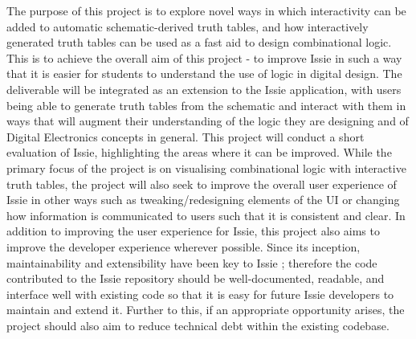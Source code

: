 The purpose of this project is to explore novel ways in which interactivity can be added to automatic schematic-derived truth tables, and how interactively generated truth tables can be used as a fast aid to design combinational logic. This is to achieve the overall aim of this project - to improve Issie in such a way that it is easier for students to understand the use of logic in digital design.
The deliverable will be integrated as an extension to the Issie application, with users being able to generate truth tables from the schematic and interact with them in ways that will augment their understanding of the logic they are designing and of Digital Electronics concepts in general. 
This project will conduct a short evaluation of Issie, highlighting the areas where it can be improved. While the primary focus of the project is on visualising combinational logic with interactive truth tables, the project will also seek to improve the overall user experience of Issie in other ways such as tweaking/redesigning elements of the UI or changing how information is communicated to users such that it is consistent and clear. 
In addition to improving the user experience for Issie, this project also aims to improve the developer experience wherever possible. Since its inception, maintainability and extensibility have been key to Issie \cite{marco_diss}; therefore the code contributed to the Issie repository should be well-documented, readable, and interface well with existing code so that it is easy for future Issie developers to maintain and extend it. Further to this, if an appropriate opportunity arises, the project should also aim to reduce technical debt within the existing codebase.

